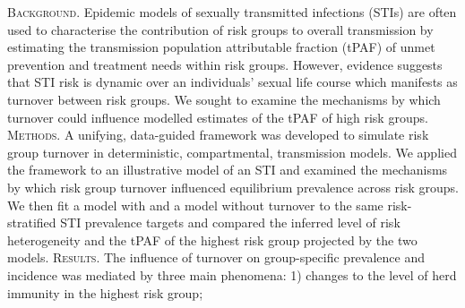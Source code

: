 \textsc{Background.}
Epidemic models of sexually transmitted infections (STIs) 
are often used to characterise										%
the contribution of risk groups
to overall transmission 
by estimating the transmission population attributable fraction (tPAF)			%
of unmet prevention and treatment needs within risk groups.
However, evidence suggests that
STI risk is dynamic over an individuals' sexual life course which 
manifests as turnover between risk groups.
We sought to examine the mechanisms by which turnover could
influence modelled estimates of the tPAF of high risk groups.					%
\textsc{Methods.}
A unifying, data-guided framework was developed to simulate risk group turnover		%
in deterministic, compartmental, transmission models.
We applied the framework to an illustrative model of an STI
and examined the mechanisms by which
risk group turnover influenced equilibrium prevalence across risk groups.
We then fit a model with and a model without turnover to the same
risk-stratified STI prevalence targets
and compared the inferred level of risk heterogeneity and
the tPAF of the highest risk group projected by the two models.						%
\textsc{Results.}
The influence of turnover on group-specific prevalence and incidence
was mediated by three main phenomena:
1) changes to the level of herd immunity in the highest risk group;					%
